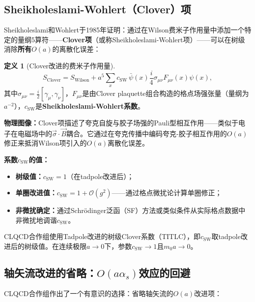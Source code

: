 \documentclass[12pt,a4paper]{ctexart}
\theoremstyle{definition}
\newtheorem{definition}{定义}[section]
\begin{document}
\subsection{Sheikholeslami-Wohlert（Clover）项}

Sheikholeslami和Wohlert于1985年证明：通过在Wilson费米子作用量中添加一个特定的量纲5算符——\textbf{Clover项}（或称Sheikholeslami-Wohlert项）——可以在树级消除\textbf{所有}$O(a)$的离散化误差：

\begin{definition}[Clover改进的费米子作用量]
\begin{equation}
\boxed{S_{\text{Clover}} = S_{\text{Wilson}} + a^5 \sum_x c_{\text{SW}} \, \bar{\psi}(x) \frac{i}{4}\sigma_{\mu\nu} F_{\mu\nu}(x) \psi(x)},
\label{eq:clover_fermion_action}
\end{equation}
其中$\sigma_{\mu\nu} = \frac{i}{2}[\gamma_\mu, \gamma_\nu]$，$F_{\mu\nu}$是由Clover plaquette组合构造的格点场强张量（量纲为$a^{-2}$），$c_{\text{SW}}$是\textbf{Sheikholeslami-Wohlert系数}。
\end{definition}

\textbf{物理图像：}Clover项描述了夸克自旋与胶子场强的Pauli型相互作用——类似于电子在电磁场中的$\vec{\sigma}\cdot\vec{B}$耦合。它通过在夸克传播中编码夸克-胶子相互作用的$O(a)$修正来抵消Wilson项引入的$O(a)$离散化误差。

\textbf{系数$c_{\text{SW}}$的值：}
\begin{itemize}
    \item \textbf{树级值：}$c_{\text{SW}} = 1$（在tadpole改进后）；
    \item \textbf{单圈改进值：}$c_{\text{SW}} = 1 + \mathcal{O}(g^2)$——通过格点微扰论计算单圈修正；
    \item \textbf{非微扰确定：}通过Schr\"odinger泛函（SF）方法或类似条件从实际格点数据中非微扰地调谐$c_{\text{SW}}$。
\end{itemize}

CLQCD合作组\cite{CLQCD2025quark_mass,CLQCD2024charm}使用Tadpole改进的树级Clover系数（TITLC），即$c_{\text{SW}}$取tadpole改进后的树级值。在连续极限$a \to 0$下，参数$c_{\text{SW}} \to 1$且$m_0 a \to 0$。

\subsection{轴矢流改进的省略：$O(a\alpha_s)$效应的回避}

CLQCD合作组\cite{CLQCD2025quark_mass}作出了一个有意识的选择：省略轴矢流的$O(a)$改进项：
\end{document}

